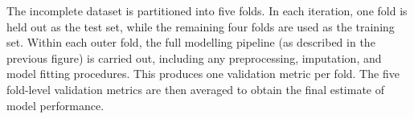 \documentclass[11pt]{article}
\begin{document}

The incomplete dataset is partitioned into five folds. In each iteration, one fold is held out as the test set, while the remaining four folds are used as the training set. Within each outer fold, the full modelling pipeline (as described in the previous figure) is carried out, including any preprocessing, imputation, and model fitting procedures. This produces one validation metric per fold. The five fold-level validation metrics are then averaged to obtain the final estimate of model performance.



\end{document}
